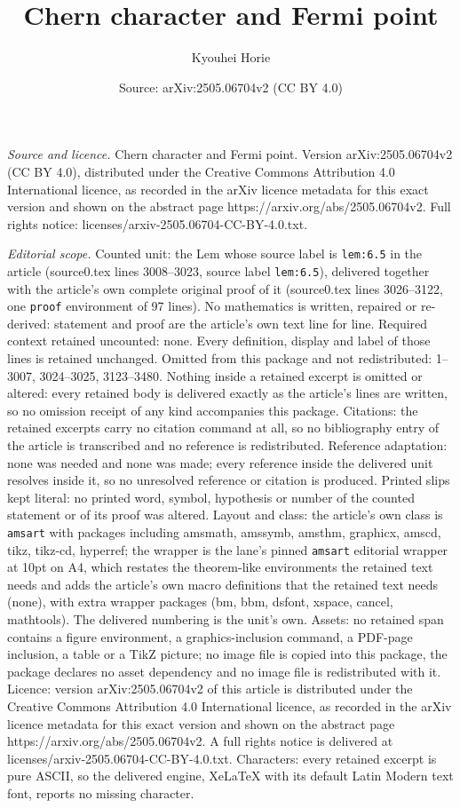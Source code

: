 \documentclass[10pt,a4paper]{amsart}
\title[Chern character and Fermi point]{Chern character and Fermi point}
\author{Kyouhei Horie}
\date{Source: arXiv:2505.06704v2 (CC BY 4.0)}
\begin{document}
\maketitle

\noindent\emph{Source and licence.} Chern character and Fermi point. Version arXiv:2505.06704v2 (CC BY 4.0), distributed under the Creative Commons Attribution 4.0 International licence, as recorded in the arXiv licence metadata for this exact version and shown on the abstract page https://arxiv.org/abs/2505.06704v2. Full rights notice: licenses/arxiv-2505.06704-CC-BY-4.0.txt.\par\smallskip

\noindent\textit{Editorial scope.} Counted unit: the Lem whose source label is \texttt{lem:6.5} in the article (source0.tex lines 3008--3023, source label \texttt{lem:6.5}), delivered together with the article's own complete original proof of it (source0.tex lines 3026--3122, one \texttt{proof} environment of 97 lines). No mathematics is written, repaired or re-derived: statement and proof are the article's own text line for line. Required context retained uncounted: none. Every definition, display and label of those lines is retained unchanged. Omitted from this package and not redistributed: 1--3007, 3024--3025, 3123--3480. Nothing inside a retained excerpt is omitted or altered: every retained body is delivered exactly as the article's lines are written, so no omission receipt of any kind accompanies this package. Citations: the retained excerpts carry no citation command at all, so no bibliography entry of the article is transcribed and no reference is redistributed. Reference adaptation: none was needed and none was made; every reference inside the delivered unit resolves inside it, so no unresolved reference or citation is produced. Printed slips kept literal: no printed word, symbol, hypothesis or number of the counted statement or of its proof was altered. Layout and class: the article's own class is \texttt{amsart} with packages including amsmath, amssymb, amsthm, graphicx, amscd, tikz, tikz-cd, hyperref; the wrapper is the lane's pinned \texttt{amsart} editorial wrapper at 10pt on A4, which restates the theorem-like environments the retained text needs and adds the article's own macro definitions that the retained text needs (none), with extra wrapper packages (bm, bbm, dsfont, xspace, cancel, mathtools). The delivered numbering is the unit's own. Assets: no retained span contains a figure environment, a graphics-inclusion command, a PDF-page inclusion, a table or a TikZ picture; no image file is copied into this package, the package declares no asset dependency and no image file is redistributed with it. Licence: version arXiv:2505.06704v2 of this article is distributed under the Creative Commons Attribution 4.0 International licence, as recorded in the arXiv licence metadata for this exact version and shown on the abstract page https://arxiv.org/abs/2505.06704v2. A full rights notice is delivered at licenses/arxiv-2505.06704-CC-BY-4.0.txt. Characters: every retained excerpt is pure ASCII, so the delivered engine, XeLaTeX with its default Latin Modern text font, reports no missing character.
\end{document}

